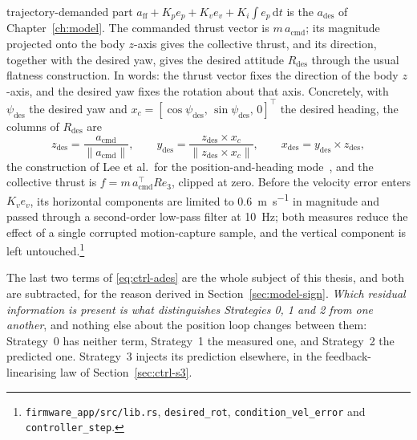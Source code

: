 trajectory-demanded part $a_{\mathrm{ff}} + K_p e_p + K_v e_v + K_i \!\int\! e_p \,\mathrm{d}t$ is the
$a_{\mathrm{des}}$ of Chapter~\ref{ch:model}. The commanded thrust vector is $m\,a_{\mathrm{cmd}}$; its
magnitude projected onto the body $z$-axis gives the collective thrust, and its direction, together
with the desired yaw, gives the desired attitude $R_{\mathrm{des}}$ through the usual flatness
construction. In words: the thrust vector fixes the direction of the body $z$-axis, and the desired
yaw fixes the rotation about that axis.
Concretely, with $\psi_{\mathrm{des}}$ the desired yaw and
$x_c = [\cos\psi_{\mathrm{des}},\, \sin\psi_{\mathrm{des}},\, 0]^\top$ the desired heading, the
columns of $R_{\mathrm{des}}$ are
\begin{equation*}
  z_{\mathrm{des}} = \frac{a_{\mathrm{cmd}}}{\lVert a_{\mathrm{cmd}} \rVert}, \qquad
  y_{\mathrm{des}} = \frac{z_{\mathrm{des}} \times x_c}{\lVert z_{\mathrm{des}} \times x_c \rVert}, \qquad
  x_{\mathrm{des}} = y_{\mathrm{des}} \times z_{\mathrm{des}},
\end{equation*}
the construction of Lee et al.\ for the position-and-heading mode~\cite{lee2010geometricse3}, and the
collective thrust is $f = m\,a_{\mathrm{cmd}}^\top R e_3$, clipped at zero. Before the velocity
error enters $K_v e_v$, its horizontal components are limited to \SI{0.6}{\metre\per\second} in
magnitude and passed through a second-order low-pass filter at \SI{10}{\hertz}; both measures
reduce the effect of a single corrupted motion-capture sample, and the vertical component is left
untouched.\footnote{\texttt{firmware\_app/src/lib.rs}, \texttt{desired\_rot},
\texttt{condition\_vel\_error} and \texttt{controller\_step}.}

The last two terms of \eqref{eq:ctrl-ades} are the whole subject of this thesis, and both are
subtracted, for the reason derived in Section~\ref{sec:model-sign}. \emph{Which residual
information is present is what distinguishes Strategies 0, 1 and 2 from one another}, and nothing
else about the position loop changes between them: Strategy~0 has neither term, Strategy~1 the
measured one, and Strategy~2 the predicted one. Strategy~3 injects its prediction elsewhere, in
the feedback-linearising law of Section~\ref{sec:ctrl-s3}.

